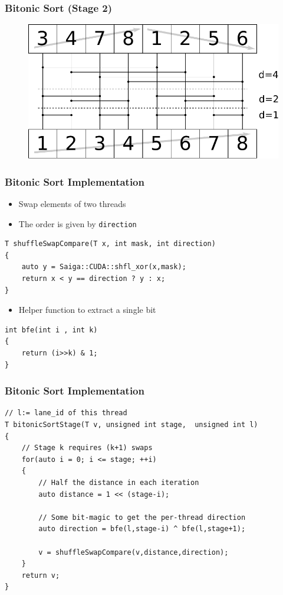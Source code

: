 \documentclass[aspectratio=169,handout]{beamer}
\begin{document}
\frame
{
	\frametitle{Bitonic Sort (Stage 2)}
	\begin{figure}
		\centering
		\includegraphics[height=0.6\textheight]{bitonic2}
	\end{figure}
}


\begin{frame}[fragile]
\frametitle{Bitonic Sort Implementation}
\begin{itemize}
	\item Swap elements of two threads
	\item The order is given by \texttt{direction}
\end{itemize}
\begin{lstlisting}
T shuffleSwapCompare(T x, int mask, int direction)
{
	auto y = Saiga::CUDA::shfl_xor(x,mask);
	return x < y == direction ? y : x;
}
\end{lstlisting}
\begin{itemize}
	\item Helper function to extract a single bit
\end{itemize}
\begin{lstlisting}
int bfe(int i , int k)
{
	return (i>>k) & 1;
}
\end{lstlisting}
\end{frame}

\begin{frame}[fragile]
\frametitle{Bitonic Sort Implementation}
\begin{lstlisting}
// l:= lane_id of this thread
T bitonicSortStage(T v, unsigned int stage,  unsigned int l)
{
	// Stage k requires (k+1) swaps
	for(auto i = 0; i <= stage; ++i)
	{
		// Half the distance in each iteration
		auto distance = 1 << (stage-i);
		
		// Some bit-magic to get the per-thread direction
		auto direction = bfe(l,stage-i) ^ bfe(l,stage+1);
		
		v = shuffleSwapCompare(v,distance,direction);
	}
	return v;
}
\end{lstlisting}
\end{frame}
\end{document}
